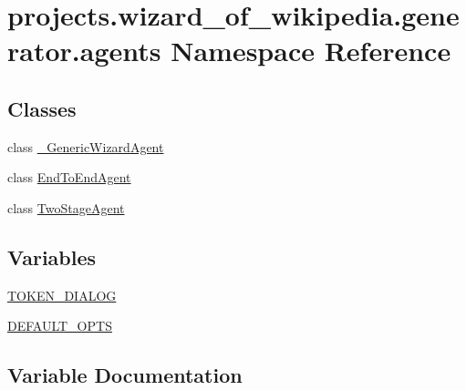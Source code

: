 \hypertarget{namespaceprojects_1_1wizard__of__wikipedia_1_1generator_1_1agents}{}\section{projects.\+wizard\+\_\+of\+\_\+wikipedia.\+generator.\+agents Namespace Reference}
\label{namespaceprojects_1_1wizard__of__wikipedia_1_1generator_1_1agents}
\subsection*{Classes}
\begin{DoxyCompactItemize}
\item 
class \hyperlink{classprojects_1_1wizard__of__wikipedia_1_1generator_1_1agents_1_1__GenericWizardAgent}{\+\_\+\+Generic\+Wizard\+Agent}
\item 
class \hyperlink{classprojects_1_1wizard__of__wikipedia_1_1generator_1_1agents_1_1EndToEndAgent}{End\+To\+End\+Agent}
\item 
class \hyperlink{classprojects_1_1wizard__of__wikipedia_1_1generator_1_1agents_1_1TwoStageAgent}{Two\+Stage\+Agent}
\end{DoxyCompactItemize}
\subsection*{Variables}
\begin{DoxyCompactItemize}
\item 
\hyperlink{namespaceprojects_1_1wizard__of__wikipedia_1_1generator_1_1agents_af2e4b02845d9fa2112f075ca2e64721c}{T\+O\+K\+E\+N\+\_\+\+D\+I\+A\+L\+OG}
\item 
\hyperlink{namespaceprojects_1_1wizard__of__wikipedia_1_1generator_1_1agents_a1d5a772394e752bbecb9deeeb7cf6661}{D\+E\+F\+A\+U\+L\+T\+\_\+\+O\+P\+TS}
\end{DoxyCompactItemize}


\subsection{Variable Documentation}
\mbox{\label{namespaceprojects_1_1wizard__of__wikipedia_1_1generator_1_1agents_a1d5a772394e752bbecb9deeeb7cf6661}} 
